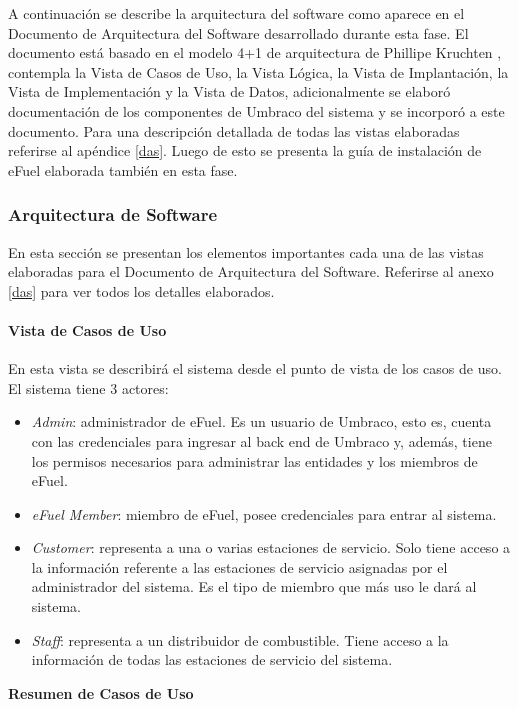 A continuación se describe la arquitectura del software como aparece en el Documento de Arquitectura del Software desarrollado durante esta fase. El documento está basado en el modelo 4+1 de arquitectura de Phillipe Kruchten \cite{41Kruchten}, contempla la Vista de Casos de Uso, la Vista Lógica, la Vista de Implantación, la Vista de Implementación y la Vista de Datos, adicionalmente se elaboró documentación de los componentes de Umbraco del sistema y se incorporó a este documento. Para una descripción detallada de todas las vistas elaboradas referirse al apéndice \ref{das}. Luego de esto se presenta la guía de instalación de eFuel elaborada también en esta fase.

\subsubsection{Arquitectura de Software}
En esta sección se presentan los elementos importantes cada una de las vistas elaboradas para el Documento de Arquitectura del Software. Referirse al anexo \ref{das} para ver todos los detalles elaborados.

\paragraph{Vista de Casos de Uso} En esta vista se describirá el sistema desde el punto de vista de los casos de uso. El sistema tiene 3 actores:

\begin{itemize}
    \item \emph{Admin}: administrador de eFuel. Es un usuario de Umbraco, esto es, cuenta con las credenciales para ingresar al back end de Umbraco y, además, tiene los permisos necesarios para administrar las entidades y los miembros de eFuel.
    \item \emph{eFuel Member}: miembro de eFuel, posee credenciales para entrar al sistema.
    \item \emph{Customer}: representa a una o varias estaciones de servicio. Solo tiene acceso a la información referente a las estaciones de servicio asignadas por el administrador del sistema. Es el tipo de miembro que más uso le dará al sistema.
    \item \emph{Staff}: representa a un distribuidor de combustible. Tiene acceso a la información de todas las estaciones de servicio del sistema.
\end{itemize}

\textbf{Resumen de Casos de Uso}

